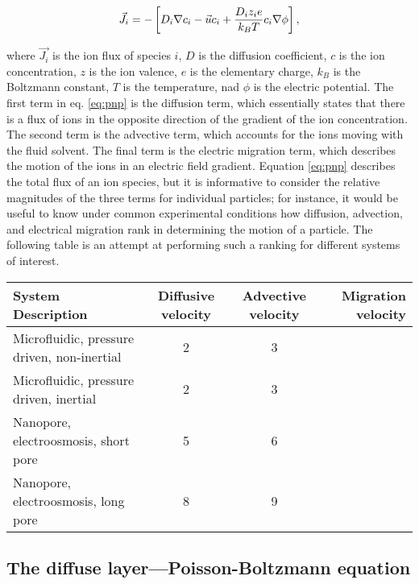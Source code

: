 			\begin{equation} \label{eq:pnp}
				\vec{J_{i}}=-\left[D_{i}\mathbf{\nabla}c_{i}-\vec{u}c_{i}+\frac{D_{i}z_{i}e}{k_{B}T}c_{i}\mathbf{\nabla}\phi\right],
			\end{equation}
	
			where $\vec{J_{i}}$ is the ion flux of species $i$, $D$ is the diffusion coefficient, $c$ is the ion concentration, $z$ is the ion valence, $e$ is the elementary charge, $k_{B}$ is the Boltzmann constant, $T$ is the temperature, nad $\phi$ is the electric potential. The first term in eq. \ref{eq:pnp} is the diffusion term, which essentially states that there is a flux of ions in the opposite direction of the gradient of the ion concentration. The second term is the advective term, which accounts for the ions moving with the fluid solvent. The final term is the electric migration term, which describes the motion of the ions in an electric field gradient. Equation \ref{eq:pnp} describes the total flux of an ion species, but it is informative to consider the relative magnitudes of the three terms for individual particles; for instance, it would be useful to know under common experimental conditions how diffusion, advection, and electrical migration rank in determining the motion of a particle. The following table is an attempt at performing such a ranking for different systems of interest.
			
			\begin{tabular}{| l | c | c | r |}
				\hline
				\textbf{System Description} & \multicolumn{1}{|p{2cm}|}{\centering \textbf{Diffusive velocity}} & \multicolumn{1}{|p{2cm}|}{\centering \textbf{Advective velocity}} & \multicolumn{1}{|p{2cm}|}{\centering \textbf{Migration velocity}} \\ \hline
				Microfluidic, pressure driven, non-inertial & 2 & 3 \\ \hline
				Microfluidic, pressure driven, inertial & 2 & 3 \\ \hline
				Nanopore, electroosmosis, short pore & 5 & 6 \\ \hline
				Nanopore, electroosmosis, long pore & 8 & 9 \\ \hline
			\end{tabular}
			
		\subsection{The diffuse layer---Poisson-Boltzmann equation}
			
